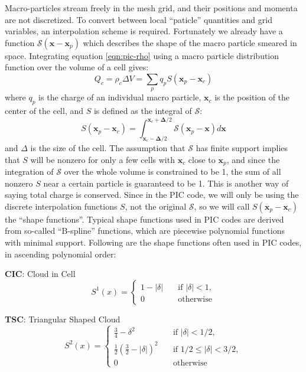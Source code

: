 Macro-particles stream freely in the mesh grid, and their positions and momenta
are not discretized. To convert between local ``paticle'' quantities and grid
variables, an interpolation scheme is required. Fortunately we already have a
function $\mathcal{S}(\mathbf{x} - \mathbf{x}_p)$ which describes the shape of the macro
particle smeared in space. Integrating equation \eqref{eqn:pic-rho} using a
macro particle distribution function over the volume of a cell gives:
\begin{equation}
  \label{eqn:rho-cell}
  Q_{c} = \rho_{c}\Delta V = \sum_pq_pS(\mathbf{x}_p-\mathbf{x}_{c})
\end{equation}
where $q_p$ is the charge of an individual macro particle, $\mathbf{x}_{c}$ is
the position of the center of the cell, and $S$ is defined as
the integral of $\mathcal{S}$:
\begin{equation}
  \label{eqn:weight-function}
  S(\mathbf{x}_p - \mathbf{x}_c) = \int_{\mathbf{x}_c - \mathbf{\Delta}/2}^{\mathbf{x}_c + \mathbf{\Delta}/2} \mathcal{S}(\mathbf{x}_p - \mathbf{x})d\mathbf{x}
\end{equation}
and $\Delta$ is the size of the cell. The assumption that $\mathcal{S}$ has
finite support implies that $S$ will be nonzero for only a few cells with
$\mathbf{x}_{c}$ close to $\mathbf{x}_{p}$, and since the integration of
$\mathcal{S}$ over the whole volume is constrained to be 1, the sum of all
nonzero $S$ near a certain particle is guaranteed to be 1. This is another way
of saying total charge is conserved. Since in the PIC code, we will only be
using the discrete interpolation functions $S$, not the original $\mathcal{S}$,
so we will call $S(\mathbf{x}_p - \mathbf{x}_c)$ the ``shape functions''.
Typical shape functions used in PIC codes are derived from so-called
``B-spline'' functions, which are piecewise polynomial functions with minimal
support. Following are the shape functions often used in PIC codes, in ascending
polynomial order:

\textbf{CIC}: Cloud in Cell
\begin{equation}
  \label{eq:first-order-deposit}
  S^1(x) = \begin{cases}
    1 - |\delta| & \quad \text{if } |\delta| < 1, \\
    0            & \quad \text{otherwise}
  \end{cases}
\end{equation}

\textbf{TSC}: Triangular Shaped Cloud
\begin{equation}
  \label{eq:second-order-deposit}
  S^2(x) =
  \begin{cases}
    \frac{3}{4} - \delta^2 & \quad \text{if } |\delta| < 1/2, \\
    \frac{1}{2} \left( \frac{3}{2} - |\delta| \right)^2 & \quad \text{if } 1/2 \leq |\delta| < 3/2, \\
    0                      & \quad \text{otherwise}
  \end{cases}
\end{equation}

